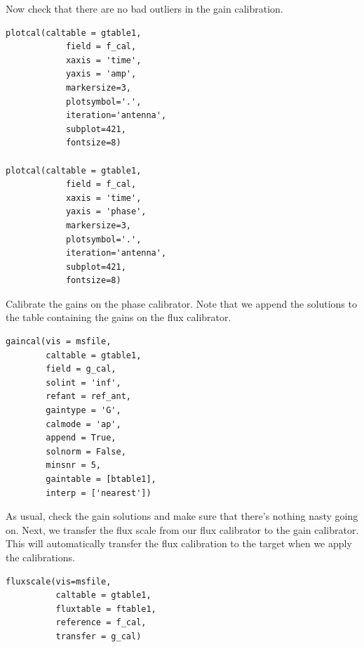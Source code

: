 \documentclass[force,almostfull,justified]{tufte-book}
\begin{document}
Now check that there are no bad outliers in the gain calibration.

\begin{casacmd}
\begin{verbatim}
plotcal(caltable = gtable1,
            field = f_cal,
            xaxis = 'time',
            yaxis = 'amp',
            markersize=3,
            plotsymbol='.',
            iteration='antenna',
            subplot=421,
            fontsize=8)

plotcal(caltable = gtable1,
            field = f_cal,
            xaxis = 'time',
            yaxis = 'phase',
            markersize=3,
            plotsymbol='.',
            iteration='antenna',
            subplot=421,
            fontsize=8)
\end{verbatim}
\end{casacmd}

Calibrate the gains on the phase calibrator. Note that we append the
solutions to the table containing the gains on the flux calibrator.

\begin{casacmd}
\begin{verbatim}
gaincal(vis = msfile,
        caltable = gtable1,
        field = g_cal,
        solint = 'inf',
        refant = ref_ant,
        gaintype = 'G',
        calmode = 'ap',
        append = True,
        solnorm = False,
        minsnr = 5,
        gaintable = [btable1],
        interp = ['nearest'])
\end{verbatim}
\end{casacmd}

As usual, check the gain solutions and make sure that there's nothing
nasty going on.  Next, we transfer the flux scale from our flux
calibrator to the gain calibrator. This will automatically transfer the
flux calibration to the target when we apply the calibrations.

\begin{casacmd}
\begin{verbatim}
fluxscale(vis=msfile,
          caltable = gtable1,
          fluxtable = ftable1,
          reference = f_cal,
          transfer = g_cal)
\end{verbatim}
\end{casacmd}

\bigskip
\end{document}
